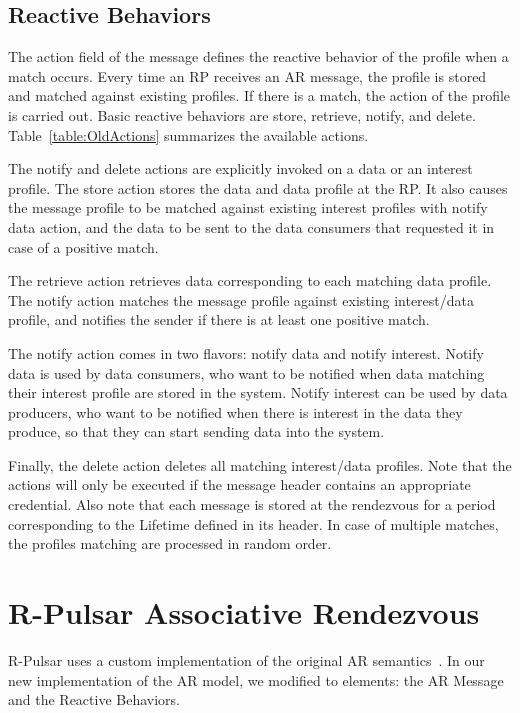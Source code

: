 \subsection{Reactive Behaviors} 

The action field of the message defines the reactive behavior of the profile when a match occurs. Every time an RP receives an AR message, the profile is stored and matched against existing profiles. If there is a match, the action of the profile is carried out. Basic reactive behaviors are store, retrieve, notify, and delete. Table~\ref{table:OldActions} summarizes the available actions.

The notify and delete actions are explicitly invoked on a data or an interest profile. The store action stores the data and data profile at the RP. It also causes the message profile to be matched against existing interest profiles with notify data action, and the data to be sent to the data consumers that requested it in case of a positive match.

The retrieve action retrieves data corresponding to each matching data profile. The notify action matches the message profile against existing interest/data profile, and notifies the sender if there is at least one positive match. 

The notify action comes in two flavors: notify data and notify interest. Notify data is used by data consumers, who want to be notified when data matching their interest profile are stored in the system. Notify interest can be used by data producers, who want to be notified when there is interest in the data they produce, so that they can start sending data into the system.

Finally, the delete action deletes all matching interest/data profiles. Note that the actions will only be executed if the message header contains an appropriate credential. Also note that each message is stored at the rendezvous for a period corresponding to the Lifetime defined in its header. In case of multiple matches, the profiles matching are processed in random order.

\section{R-Pulsar Associative Rendezvous}\label{sec:semantics}
R-Pulsar uses a custom implementation of the original AR semantics~\cite{meteor2008}. In our new implementation of the AR model, we modified to elements: the AR Message and the Reactive Behaviors.

